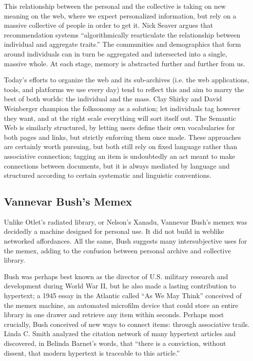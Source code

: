 This relationship between the personal and the collective is taking on new meaning on the web, where we expect personalized information, but rely on a massive collective of people in order to get it. Nick Seaver argues that recommendation systems “algorithmically rearticulate the relationship between individual and aggregate traits.”  The communities and demographics that form around individuals can in turn be aggregated and intersected into a single, massive whole. At each stage, memory is abstracted further and further from us.

Today’s efforts to organize the web and its sub-archives (i.e. the web applications, tools, and platforms we use every day) tend to reflect this and aim to marry the best of both worlds: the individual and the mass. Clay Shirky and David Weinberger champion the folksonomy as a solution; let individuals tag however they want, and at the right scale everything will sort itself out.  The Semantic Web is similarly structured, by letting users define their own vocabularies for both pages and links, but strictly enforcing them once made.  These approaches are certainly worth pursuing, but both still rely on fixed language rather than associative connection; tagging an item is undoubtedly an act meant to make connections between documents, but it is always mediated by language and structured according to certain systematic and linguistic conventions.

\subsection{Vannevar Bush's Memex}

Unlike Otlet’s radiated library, or Nelson’s Xanadu, Vannevar Bush’s memex was decidedly a machine designed for personal use. It did not build in weblike networked affordances. All the same, Bush suggests many intersubjective uses for the memex, adding to the confusion between personal archive and collective library.

Bush was perhaps best known as the director of U.S. military research and development during World War II, but he also made a lasting contribution to hypertext; a 1945 essay in the Atlantic called “As We May Think” conceived of the memex machine, an automated microfilm device that could store an entire library in one drawer and retrieve any item within seconds.  Perhaps most crucially, Bush conceived of new ways to connect items: through associative trails. Linda C. Smith analyzed the citation network of many hypertext articles and discovered, in Belinda Barnet’s words, that “there is a conviction, without dissent, that modern hypertext is traceable to this article.” 

